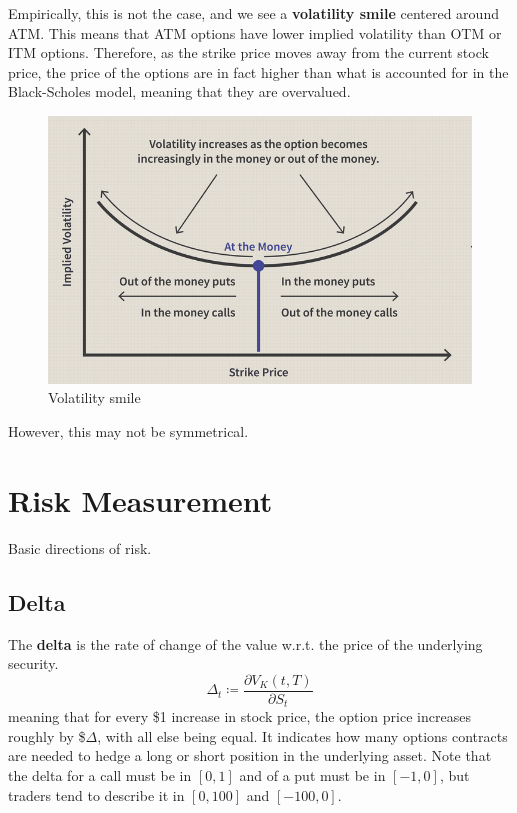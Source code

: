 \documentclass{article}
\begin{document}
    \begin{definition}
      Empirically, this is not the case, and we see a \textbf{volatility smile} centered around ATM. This means that ATM options have lower implied volatility than OTM or ITM options. Therefore, as the strike price moves away from the current stock price, the price of the options are in fact higher than what is accounted for in the Black-Scholes model, meaning that they are overvalued.  
      \begin{figure}[H]
        \centering 
        \includegraphics[scale=0.4]{img/vol_smile.png}
        \caption{Volatility smile} 
        \label{fig:vol_smile}
      \end{figure}
    \end{definition}

    However, this may not be symmetrical. 

    \begin{definition}
      
    \end{definition}

\section{Risk Measurement}

  Basic directions of risk. 

  \subsection{Delta}

    \begin{definition}[Delta]
      The \textbf{delta} is the rate of change of the value w.r.t. the price of the underlying security. 
      \begin{equation}
        \Delta_t \coloneqq \frac{\partial V_K (t, T)}{\partial S_t}
      \end{equation}
      meaning that for every \$1 increase in stock price, the option price increases roughly by \$$\Delta$, with all else being equal. It indicates how many options contracts are needed to hedge a long or short position in the underlying asset. Note that the delta for a call must be in $[0, 1]$ and of a put must be in $[-1, 0]$, but traders tend to describe it in $[0, 100]$ and $[-100, 0]$. 
    \end{definition}
\end{document}
